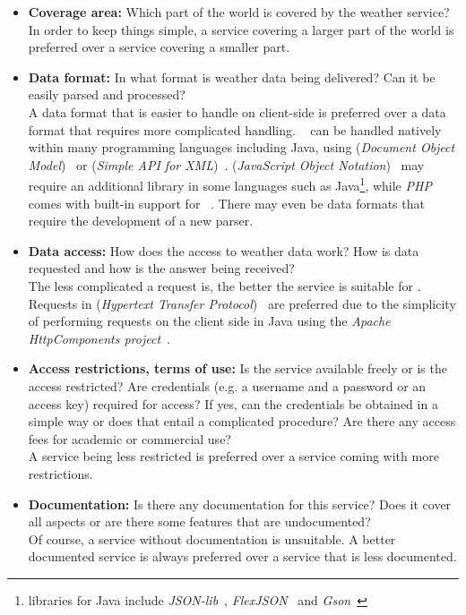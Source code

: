 \begin{itemize}
  \item \textbf{Coverage area:} Which part of the world is covered by the weather service?\\
  In order to keep things simple, a service covering a larger part of the world is preferred over a service covering a smaller part.
  
  \item \textbf{Data format:} In what format is weather data being delivered? Can it be easily parsed and processed?\\
  A data format that is easier to handle on client-side is preferred over a data format that requires more complicated handling. ~\cite{XML} can be handled natively within many programming languages including Java, using  (\emph{Document Object Model})~\cite{DOM} or  (\emph{Simple \acs{API} for \acs{XML}})~\cite{SAX}.  (\emph{JavaScript Object Notation})~\cite{rfc4627} may require an additional library in some languages such as Java\footnote{ libraries for Java include \emph{JSON-lib}~\cite{json-lib}, \emph{FlexJSON}~\cite{flexjson} and \emph{Gson}~\cite{gson}}, while \emph{PHP} comes with built-in support for ~\cite{php-json}. There may even be data formats that require the development of a new parser.
  
  \item \textbf{Data access:} How does the access to weather data work? How is data requested and how is the answer being received?\\
  The less complicated a request is, the better the service is suitable for \smarthomeweather. Requests in  (\emph{Hypertext Transfer Protocol})~\cite{rfc2616} are preferred due to the simplicity of performing requests on the client side in Java using the \emph{Apache HttpComponents project}~\cite{apache_hc}.
  
  \item \textbf{Access restrictions, terms of use:} Is the service available freely or is the access restricted? Are credentials (e.g. a username and a password or an access key) required for access? If yes, can the credentials be obtained in a simple way or does that entail a complicated procedure? Are there any access fees for academic or commercial use?\\
  A service being less restricted is preferred over a service coming with more restrictions.
  
  \item \textbf{Documentation:} Is there any documentation for this service? Does it cover all aspects or are there some features that are undocumented?\\
  Of course, a service without documentation is unsuitable. A better documented service is always preferred over a service that is less documented.
  

\end{itemize}
